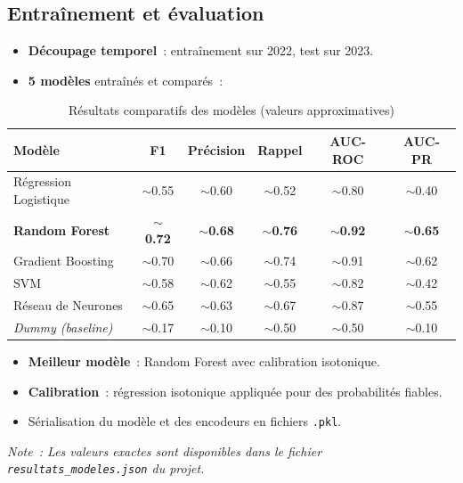 \documentclass[a4paper,12pt]{report}
\begin{document}
\subsection{Entraînement et évaluation}

\begin{itemize}
    \item \textbf{Découpage temporel}~: entraînement sur 2022, test sur 2023.
    \item \textbf{5 modèles} entraînés et comparés~:
\end{itemize}

\begin{table}[h!]
\centering
\renewcommand{\arraystretch}{1.3}
\begin{tabular}{|l|c|c|c|c|c|}
\hline
\rowcolor{bpmblue!10}
\textbf{Modèle} & \textbf{F1} & \textbf{Précision} & \textbf{Rappel} & \textbf{AUC-ROC} & \textbf{AUC-PR} \\
\hline
Régression Logistique & $\sim$0.55 & $\sim$0.60 & $\sim$0.52 & $\sim$0.80 & $\sim$0.40 \\
\hline
\textbf{Random Forest} & $\sim$\textbf{0.72} & $\sim$\textbf{0.68} & $\sim$\textbf{0.76} & $\sim$\textbf{0.92} & $\sim$\textbf{0.65} \\
\hline
Gradient Boosting & $\sim$0.70 & $\sim$0.66 & $\sim$0.74 & $\sim$0.91 & $\sim$0.62 \\
\hline
SVM & $\sim$0.58 & $\sim$0.62 & $\sim$0.55 & $\sim$0.82 & $\sim$0.42 \\
\hline
Réseau de Neurones & $\sim$0.65 & $\sim$0.63 & $\sim$0.67 & $\sim$0.87 & $\sim$0.55 \\
\hline
\textit{Dummy (baseline)} & $\sim$0.17 & $\sim$0.10 & $\sim$0.50 & $\sim$0.50 & $\sim$0.10 \\
\hline
\end{tabular}
\caption{Résultats comparatifs des modèles (valeurs approximatives)}
\end{table}

\begin{itemize}
    \item \textbf{Meilleur modèle}~: Random Forest avec calibration isotonique.
    \item \textbf{Calibration}~: régression isotonique appliquée pour des probabilités fiables.
    \item Sérialisation du modèle et des encodeurs en fichiers \texttt{.pkl}.
\end{itemize}

\textit{Note~: Les valeurs exactes sont disponibles dans le fichier \texttt{resultats\_modeles.json} du projet.}
\end{document}
